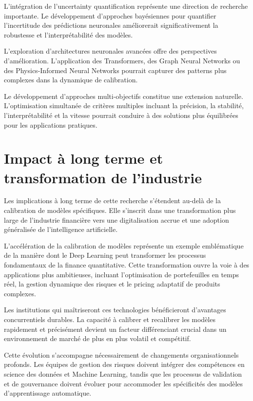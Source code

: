 L'intégration de l'uncertainty quantification représente une direction de recherche importante. Le développement d'approches bayésiennes pour quantifier l'incertitude des prédictions neuronales améliorerait significativement la robustesse et l'interprétabilité des modèles.

L'exploration d'architectures neuronales avancées offre des perspectives d'amélioration. L'application des Transformers, des Graph Neural Networks ou des Physics-Informed Neural Networks pourrait capturer des patterns plus complexes dans la dynamique de calibration.

Le développement d'approches multi-objectifs constitue une extension naturelle. L'optimisation simultanée de critères multiples incluant la précision, la stabilité, l'interprétabilité et la vitesse pourrait conduire à des solutions plus équilibrées pour les applications pratiques.

\section{Impact à long terme et transformation de l'industrie}

Les implications à long terme de cette recherche s'étendent au-delà de la calibration de modèles spécifiques. Elle s'inscrit dans une transformation plus large de l'industrie financière vers une digitalisation accrue et une adoption généralisée de l'intelligence artificielle.

L'accélération de la calibration de modèles représente un exemple emblématique de la manière dont le Deep Learning peut transformer les processus fondamentaux de la finance quantitative. Cette transformation ouvre la voie à des applications plus ambitieuses, incluant l'optimisation de portefeuilles en temps réel, la gestion dynamique des risques et le pricing adaptatif de produits complexes.

Les institutions qui maîtriseront ces technologies bénéficieront d'avantages concurrentiels durables. La capacité à calibrer et recalibrer les modèles rapidement et précisément devient un facteur différenciant crucial dans un environnement de marché de plus en plus volatil et compétitif.

Cette évolution s'accompagne nécessairement de changements organisationnels profonds. Les équipes de gestion des risques doivent intégrer des compétences en science des données et Machine Learning, tandis que les processus de validation et de gouvernance doivent évoluer pour accommoder les spécificités des modèles d'apprentissage automatique.

